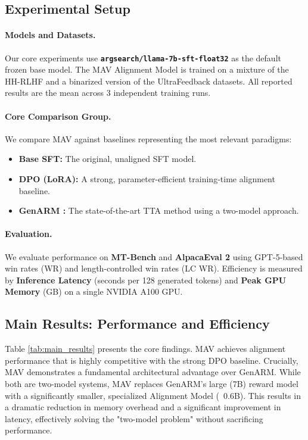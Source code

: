 \documentclass{article} %
\begin{document}
\subsection{Experimental Setup}

\paragraph{Models and Datasets.}
Our core experiments use \textbf{\texttt{argsearch/llama-7b-sft-float32}} as the default frozen base model. The MAV Alignment Model is trained on a mixture of the HH-RLHF \citep{bai2022training} and a binarized version of the UltraFeedback \citep{cui2023ultrafeedback} datasets. All reported results are the mean across 3 independent training runs.

\paragraph{Core Comparison Group.}
We compare MAV against baselines representing the most relevant paradigms:
\begin{itemize}
    \item \textbf{Base SFT:} The original, unaligned SFT model.
    \item \textbf{DPO (LoRA):} A strong, parameter-efficient training-time alignment baseline.
    \item \textbf{GenARM \citep{xu2024genarm}:} The state-of-the-art TTA method using a two-model approach.
\end{itemize}

\paragraph{Evaluation.}
We evaluate performance on \textbf{MT-Bench} and \textbf{AlpacaEval 2} using GPT-5-based win rates (WR) and length-controlled win rates (LC WR). Efficiency is measured by \textbf{Inference Latency} (seconds per 128 generated tokens) and \textbf{Peak GPU Memory} (GB) on a single NVIDIA A100 GPU.

\subsection{Main Results: Performance and Efficiency}
Table \ref{tab:main_results} presents the core findings. MAV achieves alignment performance that is highly competitive with the strong DPO baseline. Crucially, MAV demonstrates a fundamental architectural advantage over GenARM. While both are two-model systems, MAV replaces GenARM's large (7B) reward model with a significantly smaller, specialized Alignment Model (~0.6B). This results in a dramatic reduction in memory overhead and a significant improvement in latency, effectively solving the "two-model problem" without sacrificing performance.
\end{document}
